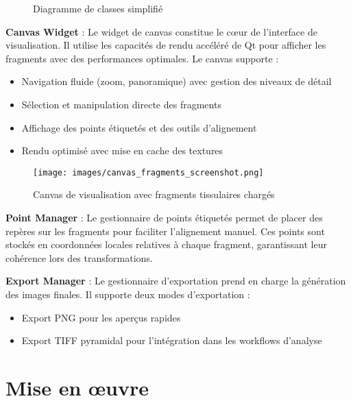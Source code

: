 \documentclass[12pt,a4paper]{report}
\begin{document}
\begin{figure}[H]
\caption{Diagramme de classes simplifié}
\end{figure}

\textbf{Canvas Widget} : Le widget de canvas constitue le cœur de l'interface de visualisation. Il utilise les capacités de rendu accéléré de Qt pour afficher les fragments avec des performances optimales. Le canvas supporte :
\begin{itemize}
\item Navigation fluide (zoom, panoramique) avec gestion des niveaux de détail
\item Sélection et manipulation directe des fragments
\item Affichage des points étiquetés et des outils d'alignement
\item Rendu optimisé avec mise en cache des textures
\end{itemize}

\begin{figure}[H]
\centering
\texttt{[image: images/canvas\_fragments\_screenshot.png]}
\caption{Canvas de visualisation avec fragments tissulaires chargés}
\label{fig:canvas_fragments}
\end{figure}

\textbf{Point Manager} : Le gestionnaire de points étiquetés permet de placer des repères sur les fragments pour faciliter l'alignement manuel. Ces points sont stockés en coordonnées locales relatives à chaque fragment, garantissant leur cohérence lors des transformations.

\textbf{Export Manager} : Le gestionnaire d'exportation prend en charge la génération des images finales. Il supporte deux modes d'exportation :
\begin{itemize}
\item Export PNG pour les aperçus rapides
\item Export TIFF pyramidal pour l'intégration dans les workflows d'analyse
\end{itemize}

\section{Mise en œuvre}
\end{document}
